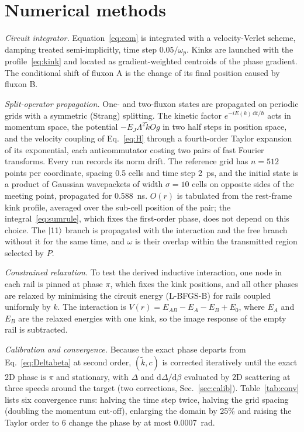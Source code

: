 \documentclass[10pt,twocolumn,letterpaper]{article}
\newcommand{\kt}{\tilde{k}}
\newcommand{\ud}{\mathrm{d}}
\begin{document}
\section{Numerical methods}
\label{sec:methods}

\emph{Circuit integrator.} Equation~\eqref{eq:eom} is integrated with a velocity-Verlet scheme, damping treated
semi-implicitly, time step $0.05/\omega_p$. Kinks are launched with the profile~\eqref{eq:kink} and located as
gradient-weighted centroids of the phase gradient. The conditional shift of fluxon A is the change of its final
position caused by fluxon B.

\emph{Split-operator propagation.} One- and two-fluxon states are propagated on periodic grids with a symmetric
(Strang) splitting. The kinetic factor $e^{-iE(k)\,\ud t/\hbar}$ acts in momentum space, the potential
$-E_J\Lambda^2\kt Og$ in two half steps in position space, and the velocity coupling of Eq.~\eqref{eq:H} through a
fourth-order Taylor expansion of its exponential, each anticommutator costing two pairs of fast Fourier transforms.
Every run records its norm drift. The reference grid has $n=512$ points per coordinate, spacing 0.5 cells and time step
2~ps, and the initial state is a product of Gaussian wavepackets of width $\sigma=10$ cells on opposite sides of the
meeting point, propagated for 0.588~ns. $O(r)$ is tabulated from the rest-frame kink profile, averaged over the sub-cell position of
the pair; the integral~\eqref{eq:sumrule}, which fixes the first-order phase, does not depend on this choice. The
$\ket{11}$ branch is propagated with the interaction and the free branch without it for the same time, and $\omega$ is
their overlap within the transmitted region selected by $P$.

\emph{Constrained relaxation.} To test the derived inductive interaction, one node in each rail is pinned at phase
$\pi$, which fixes the kink positions, and all other phases are relaxed by minimising the circuit energy (L-BFGS-B)
for rails coupled uniformly by $k$. The interaction is $V(r)=E_{AB}-E_A-E_B+E_0$, where $E_A$ and $E_B$ are the relaxed
energies with one kink, so the image response of the empty rail is subtracted.

\emph{Calibration and convergence.} Because the exact phase departs from Eq.~\eqref{eq:Deltabeta} at second order,
$(\kt,c)$ is corrected iteratively until the exact 2D phase is $\pi$ and stationary, with $\Delta$ and
$\ud\Delta/\ud\beta$ evaluated by 2D scattering at three speeds around the target (two corrections,
Sec.~\ref{sec:calib}).
Table~\ref{tab:conv} lists six convergence runs: halving the time step twice, halving the grid spacing (doubling the
momentum cut-off), enlarging the domain by 25\% and raising the Taylor order to 6 change the phase by at most
0.0007~rad.
\end{document}
